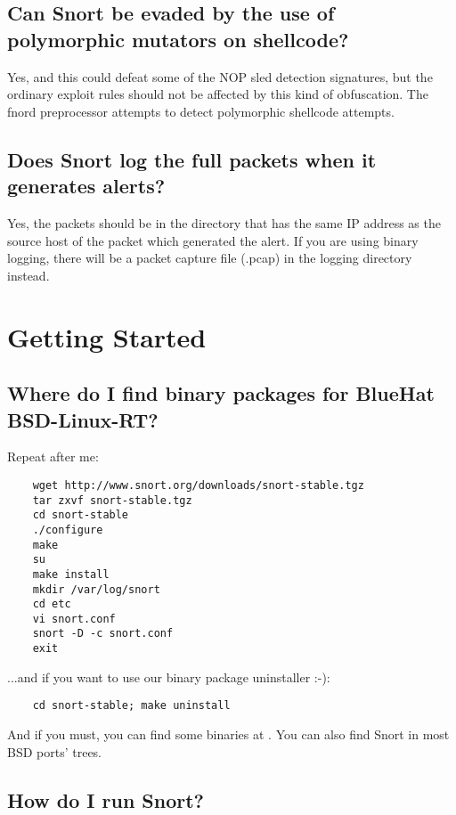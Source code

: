 \documentclass{article}
\begin{document}
\subsection{Can Snort be evaded by the use of polymorphic mutators on shellcode?}

Yes, and this could defeat some of the NOP sled detection signatures,
but the ordinary exploit rules should not be affected by this kind
of obfuscation.  The fnord preprocessor attempts to detect polymorphic
shellcode attempts.

\subsection{Does Snort log the full packets when it generates alerts? }

Yes, the packets should be in the directory that has the same IP address as the
source host of the packet which generated the alert. If you are using binary
logging, there will be a packet capture file (.pcap) in the logging directory
instead.
  
\section{Getting Started}

\subsection{Where do I find binary packages for BlueHat BSD-Linux-RT?}

Repeat after me:

\begin{verbatim}
    wget http://www.snort.org/downloads/snort-stable.tgz
    tar zxvf snort-stable.tgz
    cd snort-stable
    ./configure
    make
    su
    make install
    mkdir /var/log/snort
    cd etc
    vi snort.conf
    snort -D -c snort.conf
    exit
\end{verbatim}

...and if you want to use our binary package uninstaller :-):
\begin{verbatim}
    cd snort-stable; make uninstall
\end{verbatim}
And if you must, you can find some binaries at . 
You can also find Snort in most BSD ports' trees.

\subsection{How do I run Snort?}
\end{document}
